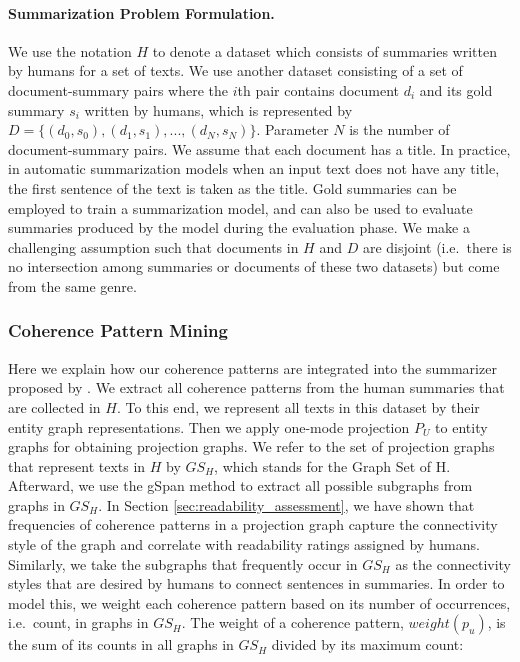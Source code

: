 \paragraph{Summarization Problem Formulation.}
We use the notation $H$ to denote a dataset which consists of summaries written by humans for a set of texts.  
We use another dataset consisting of a set of document-summary pairs where the $i$th pair contains document $d_i$ and its gold summary $s_i$ written by humans, which is represented by $D=\lbrace \left( d_0, s_0 \right), \left( d_1, s_1 \right),...,\left( d_N, s_N \right) \rbrace$. 
Parameter $N$ is the number of document-summary pairs.  
We assume that each document has a title. 
In practice, in automatic summarization models when an input text does not have any title, the first sentence of the text is taken as the title. 
Gold summaries can be employed to train a summarization model, and can also be used to evaluate summaries produced by the model during the evaluation phase. 
We make a challenging assumption such that documents in $H$ and $D$ are disjoint (i.e.\ there is no intersection among summaries or documents of these two datasets) but come from the same genre. 

\subsubsection{Coherence Pattern Mining}
Here we explain how our coherence patterns are integrated into the summarizer proposed by . 
We extract all coherence patterns from the human summaries that are collected in $H$. 
To this end, we represent all texts in this dataset by their entity graph representations. 
Then we apply one-mode projection $P_U$ to entity graphs for obtaining projection graphs. 
We refer to the set of projection graphs that represent texts in $H$ by $GS_H$, which stands for the Graph Set of H. 
Afterward, we use the gSpan method to extract all possible subgraphs from graphs in $GS_H$. 
In Section \ref{sec:readability_assessment}, we have shown that frequencies of coherence patterns in a projection graph capture the connectivity style of the graph and correlate with readability ratings assigned by humans.  
Similarly, we take the subgraphs that frequently occur in $GS_H$ as the connectivity styles that are desired by humans to connect sentences in summaries. 
In order to model this, we weight each coherence pattern based on its number of occurrences, i.e.\ count, in graphs in $GS_H$.  
The weight of a coherence pattern, $weight(p_u)$, is the sum of its counts in all graphs in $GS_H$ divided by its maximum count:

